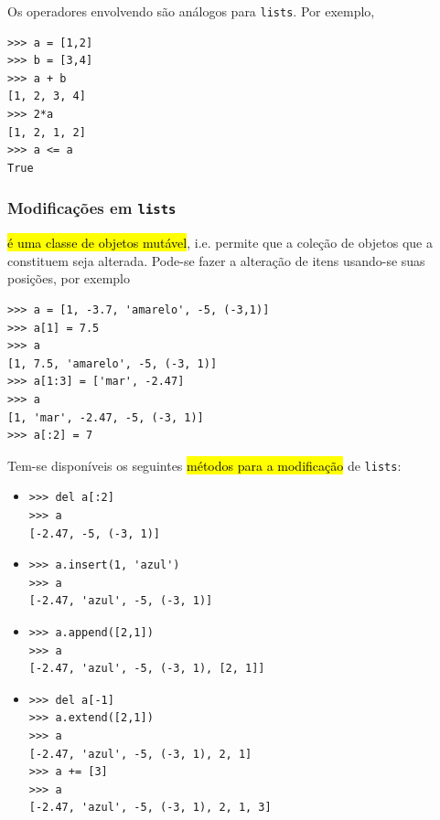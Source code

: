 \begin{obs}
  Os operadores envolvendo \texttt{\PYTHONtuple} são análogos para \texttt{lists}. Por exemplo,

\begin{lstlisting}
>>> a = [1,2]
>>> b = [3,4]
>>> a + b
[1, 2, 3, 4]
>>> 2*a
[1, 2, 1, 2]
>>> a <= a
True
\end{lstlisting}

\end{obs}

\subsubsection{Modificações em \texttt{lists}}

\hl{{\PYTHONlist} é uma classe de objetos mutável}, i.e. permite que a coleção de objetos que a constituem seja alterada. Pode-se fazer a alteração de itens usando-se suas posições, por exemplo

\begin{lstlisting}
>>> a = [1, -3.7, 'amarelo', -5, (-3,1)] 
>>> a[1] = 7.5
>>> a
[1, 7.5, 'amarelo', -5, (-3, 1)]
>>> a[1:3] = ['mar', -2.47]
>>> a
[1, 'mar', -2.47, -5, (-3, 1)]
>>> a[:2] = 7
\end{lstlisting}

Tem-se disponíveis os seguintes \hl{métodos para a modificação} de \texttt{lists}:
\begin{itemize}
\item {\PYTHONdel} 

\begin{lstlisting}[xrightmargin=2.5em]
>>> del a[:2]
>>> a
[-2.47, -5, (-3, 1)]
\end{lstlisting}

\item {\PYTHONlistDOTinsert} 

\begin{lstlisting}[xrightmargin=2.5em]
>>> a.insert(1, 'azul')
>>> a
[-2.47, 'azul', -5, (-3, 1)]
\end{lstlisting}

\item {\PYTHONlistDOTappend} 

\begin{lstlisting}[xrightmargin=2.5em]
>>> a.append([2,1])
>>> a
[-2.47, 'azul', -5, (-3, 1), [2, 1]]
\end{lstlisting}

\item {\PYTHONlistDOTextend} 

\begin{lstlisting}[xrightmargin=2.5em]
>>> del a[-1]
>>> a.extend([2,1])
>>> a
[-2.47, 'azul', -5, (-3, 1), 2, 1]
>>> a += [3]
>>> a
[-2.47, 'azul', -5, (-3, 1), 2, 1, 3]
\end{lstlisting}

\end{itemize}

